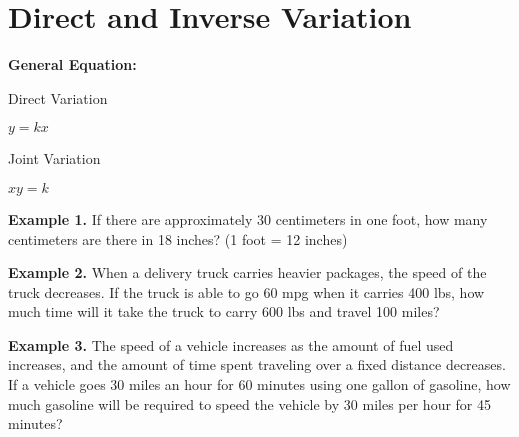 \section{Direct and Inverse Variation}

\bigskip
\textbf{General Equation:} 

\begin{center}
\setlength{\columnseprule}{0pt}
\begin{multicols}{2}
Direct Variation

$y=kx$

\columnbreak
Joint Variation

$xy=k$
\end{multicols}
\end{center}

\vfill
\textbf{Example 1.} If there are approximately 30 centimeters in one foot, how many centimeters are there in 18 inches? (1 foot = 12 inches)

\vfill
\textbf{Example 2.}  When a delivery truck carries heavier packages, the speed of the truck decreases. If the truck is able to go 60 mpg when it carries 400 lbs, how much time will it take the truck to carry 600 lbs and travel 100 miles?

\vfill
\textbf{Example 3.} The speed of a vehicle increases as the amount of fuel used increases, and the amount of time spent traveling over a fixed distance decreases. If a vehicle goes 30 miles an hour for 60 minutes using one gallon of gasoline, how much gasoline will be required to speed the vehicle by 30 miles per hour for 45 minutes?

